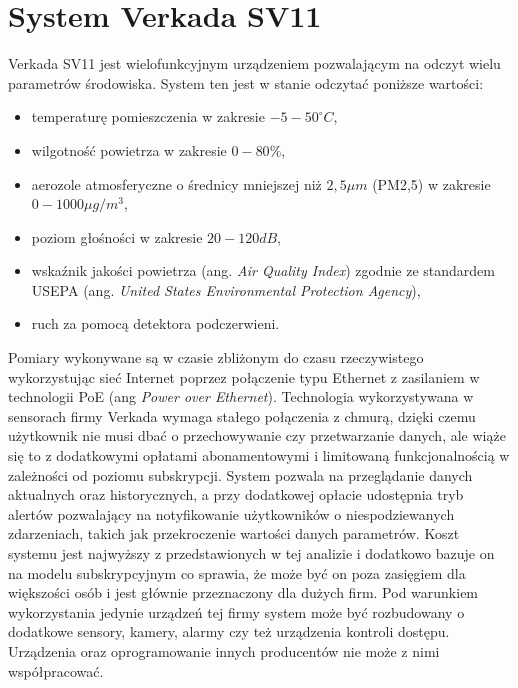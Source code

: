 \section{System Verkada SV11}
Verkada SV11 jest wielofunkcyjnym urządzeniem \cite{verkada:sv11} pozwalającym na odczyt wielu
parametrów środowiska. System ten jest w stanie odczytać poniższe wartości:
\begin{itemize}
  \item temperaturę pomieszczenia w zakresie $-5 - 50 ^\circ C$,
  \item wilgotność powietrza w zakresie $0-80\%$,
  \item aerozole atmosferyczne o średnicy mniejszej niż $2,5\mu m$ (PM2,5) w zakresie $0-1000\mu g/m^3$,
  \item poziom głośności w zakresie $20 - 120dB$,
  \item wskaźnik jakości powietrza (ang. \emph{Air Quality Index}) zgodnie ze standardem USEPA (ang. \emph{United States Environmental Protection Agency}),
  \item ruch za pomocą detektora podczerwieni.
\end{itemize}
Pomiary wykonywane są w czasie zbliżonym do czasu rzeczywistego wykorzystując sieć Internet
poprzez połączenie typu Ethernet z zasilaniem w technologii PoE (ang \emph{Power over Ethernet}). 
Technologia wykorzystywana w sensorach firmy Verkada wymaga stałego połączenia z chmurą, 
dzięki czemu użytkownik nie musi dbać o przechowywanie czy przetwarzanie danych, ale
wiąże się to z dodatkowymi opłatami abonamentowymi i limitowaną funkcjonalnością w zależności
od poziomu subskrypcji. System pozwala na przeglądanie danych aktualnych oraz historycznych, a
przy dodatkowej opłacie udostępnia tryb alertów pozwalający na notyfikowanie użytkowników o
niespodziewanych zdarzeniach, takich jak przekroczenie wartości danych parametrów.
Koszt systemu jest najwyższy z przedstawionych w tej analizie i dodatkowo bazuje on na
modelu subskrypcyjnym co sprawia, że może być on poza zasięgiem dla większości osób i jest
głównie przeznaczony dla dużych firm.
Pod warunkiem wykorzystania jedynie urządzeń tej firmy system może być rozbudowany o 
dodatkowe sensory, kamery, alarmy czy też urządzenia kontroli dostępu. Urządzenia oraz
oprogramowanie innych producentów nie może z nimi współpracować.

